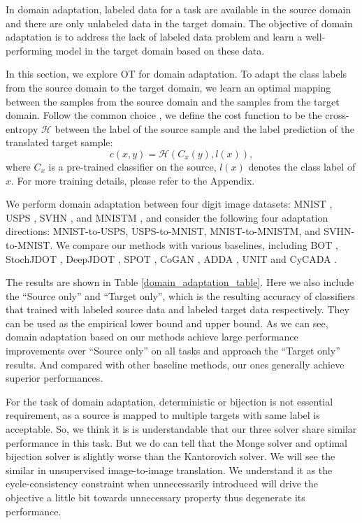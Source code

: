 \documentclass[runningheads]{llncs}
\begin{document}
In domain adaptation, labeled data for a task are available in the source domain and there are only unlabeled data in the target domain. The objective of domain adaptation is to address the lack of labeled data problem and learn a well-performing model in the target domain based on these data. 

In this section, we explore OT for domain adaptation. To adapt the class labels from the source domain to the target domain, we learn an optimal mapping between the samples from the source domain and the samples from the target domain. Follow the common choice \cite{cycada,spot}, we define the cost function to be the cross-entropy $\mathcal{H}$ between the label of the source sample and the label prediction of the translated target sample: 
\begin{equation}
c(x, y) = \mathcal{H}(C_x(y), l(x)), 
\end{equation}
where $C_{x}$ is a pre-trained classifier on the source, $l(x)$ denotes the class label of $x$. For more training details, please refer to the Appendix. 

We perform domain adaptation between four digit image datasets: MNIST \cite{mnist}, USPS \cite{usps}, SVHN \cite{svhn}, and MNISTM \cite{mnistm}, and consider the following four adaptation directions: MNIST-to-USPS, USPS-to-MNIST, MNIST-to-MNISTM, and SVHN-to-MNIST. We compare our methods with various baselines, including BOT \cite{large-scale}, StochJDOT \cite{stochjdot}, DeepJDOT \cite{deepjdot}, SPOT \cite{spot}, CoGAN \cite{cogan}, ADDA \cite{adda}, UNIT \cite{unit} and CyCADA \cite{cycada}. 

The results are shown in Table \ref{domain_adaptation_table}. Here we also include the ``Source only'' and ``Target only'', which is the resulting accuracy of classifiers that trained with labeled source data and labeled target data respectively. They can be used as the empirical lower bound and upper bound. As we can see, domain adaptation based on our methods achieve large performance improvements over ``Source only'' on all tasks and approach the ``Target only'' results. And compared with other baseline methods, our ones generally achieve superior performances. 

For the task of domain adaptation, deterministic or bijection is not essential requirement, as a source is mapped to multiple targets with same label is acceptable. So, we think it is is understandable that our three solver share similar performance in this task. But we do can tell that the Monge solver and optimal bijection solver is slightly worse than the Kantorovich solver. We will see the similar in unsupervised image-to-image translation. We understand it as the cycle-consistency constraint when unnecessarily introduced will drive the objective a little bit towards unnecessary property thus degenerate its performance. 
\end{document}

